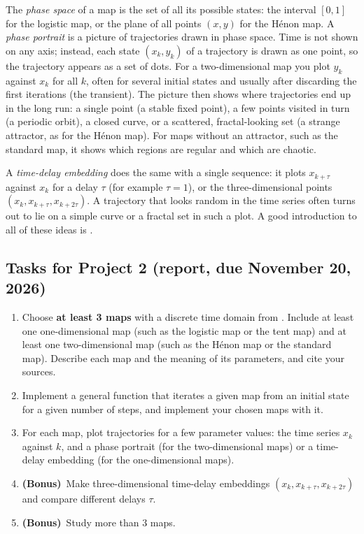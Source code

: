 \documentclass[11pt,a4paper]{article}
\newcommand{\bonus}{\textbf{(Bonus)}}
\begin{document}
The \emph{phase space} of a map is the set of all its possible states: the
interval $[0, 1]$ for the logistic map, or the plane of all points $(x, y)$
for the H\'enon map. A \emph{phase portrait} is a picture of trajectories
drawn in phase space. Time is not shown on any axis; instead, each state
$(x_k, y_k)$ of a trajectory is drawn as one point, so the trajectory appears
as a set of dots. For a two-dimensional map you plot $y_k$ against $x_k$ for
all $k$, often for several initial states and usually after discarding the
first iterations (the transient). The picture then shows where trajectories
end up in the long run: a single point (a stable fixed point), a few points
visited in turn (a periodic orbit), a closed curve, or a scattered,
fractal-looking set (a strange attractor, as for the H\'enon map). For maps
without an attractor, such as the standard map, it shows which regions are
regular and which are chaotic.

A \emph{time-delay embedding} does the same with a single sequence: it
plots $x_{k+\tau}$ against $x_k$ for a delay $\tau$ (for example $\tau = 1$),
or the three-dimensional points $(x_k, x_{k+\tau}, x_{k+2\tau})$. A
trajectory that looks random in the time series often turns out to lie on a
simple curve or a fractal set in such a plot. A good introduction to all of
these ideas is \cite{strogatz}.

\subsection*{Tasks for Project 2 (report, due November 20, 2026)}
\begin{enumerate}
  \item Choose \textbf{at least 3 maps} with a discrete time domain from
        \cite{list}. Include at least one one-dimensional map (such as the
        logistic map or the tent map) and at least one two-dimensional map
        (such as the H\'enon map or the standard map). Describe each map and
        the meaning of its parameters, and cite your sources.
  \item Implement a general function that iterates a given map from an
        initial state for a given number of steps, and implement your chosen
        maps with it.
  \item For each map, plot trajectories for a few parameter values: the time
        series $x_k$ against $k$, and a phase portrait (for the
        two-dimensional maps) or a time-delay embedding (for the
        one-dimensional maps).
  \item \bonus\ Make three-dimensional time-delay embeddings
        $(x_k, x_{k+\tau}, x_{k+2\tau})$ and compare different delays
        $\tau$.
  \item \bonus\ Study more than 3 maps.
\end{enumerate}
\end{document}
